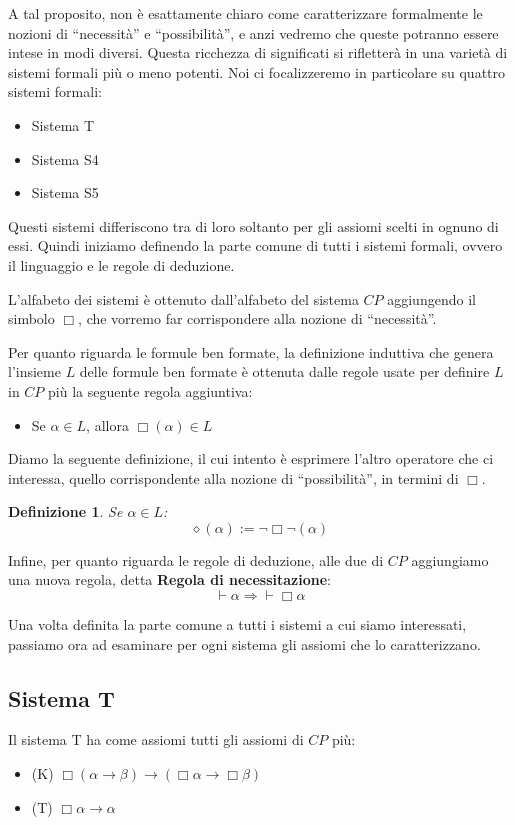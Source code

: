 \documentclass[a4paper, titlepage, 12pt]{report}
\newtheorem{definition}{Definizione}
\begin{document}
A tal proposito, non è esattamente chiaro come caratterizzare formalmente
le nozioni di ``necessità'' e ``possibilità'', e anzi vedremo che queste potranno essere
intese in modi diversi.
Questa ricchezza di significati si rifletterà in una varietà di sistemi formali più o meno potenti.
Noi ci focalizzeremo in particolare su quattro sistemi formali:
\begin{itemize}
\item Sistema T
\item Sistema S4
\item Sistema S5
\end{itemize}

Questi sistemi differiscono tra di loro soltanto per gli assiomi scelti in ognuno di essi.
Quindi iniziamo definendo la parte comune di tutti i sistemi formali, ovvero il linguaggio
e le regole di deduzione.

L'alfabeto dei sistemi è ottenuto dall'alfabeto del sistema $CP$ aggiungendo il simbolo $\Box$,
che vorremo far corrispondere alla nozione di ``necessità''.

Per quanto riguarda le formule ben formate, la definizione induttiva che genera l'insieme $L$
delle formule ben formate è ottenuta dalle regole usate per definire $L$ in $CP$ più
la seguente regola aggiuntiva:
\begin{itemize}
\item Se $\alpha \in L$, allora $\Box (\alpha) \in L$
\end{itemize}

Diamo la seguente definizione, il cui intento è esprimere l'altro operatore
che ci interessa, quello corrispondente alla nozione di ``possibilità'', in termini di $\Box$.

\begin{definition}
Se $\alpha \in L$:
$$\diamond (\alpha) := \neg \Box \neg (\alpha)$$
\end{definition}

Infine, per quanto riguarda le regole di deduzione, alle due di $CP$ aggiungiamo
una nuova regola, detta \textbf{Regola di necessitazione}:
$$\vdash \alpha \Rightarrow \vdash \Box \alpha$$

Una volta definita la parte comune a tutti i sistemi a cui siamo interessati,
passiamo ora ad esaminare per ogni sistema gli assiomi che lo caratterizzano.

\subsection{Sistema T}
Il sistema T ha come assiomi tutti gli assiomi di $CP$ più:
\begin{itemize}
\item (K) $\Box (\alpha \rightarrow \beta) \rightarrow (\Box \alpha \rightarrow \Box \beta)$
\item (T) $\Box \alpha \rightarrow \alpha$
\end{itemize}
\end{document}
